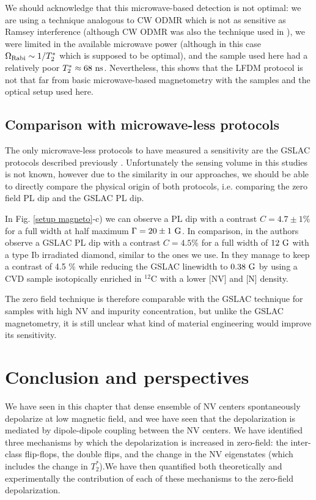 \documentclass[a4paper,11pt]{report}
\begin{document}
We should acknowledge that this microwave-based detection is not optimal: we are using a technique analogous to CW ODMR which is not as sensitive as Ramsey interference (although CW ODMR was also the technique used in \citep{barry2016optical}), we were limited in the available microwave power (although in this case $\Omega_{\rm Rabi} \sim 1/T_2^*$ which is supposed to be optimal), and the sample used here had a relatively poor $T_2^* \approx 68\ \rm ns$. Nevertheless, this shows that the LFDM protocol is not that far from basic microwave-based magnetometry with the samples and the optical setup used here.

\subsection{Comparison with microwave-less protocols}
The only microwave-less protocols to have measured a sensitivity are the GSLAC protocols described previously \citep{wickenbrock2016microwave, zheng2020microwave}. Unfortunately the sensing volume in this studies is not known, however due to the similarity in our approaches, we should be able to directly compare the physical origin of both protocols, i.e. comparing the zero field PL dip and the GSLAC PL dip.

In Fig. \ref{setup magneto}-c) we can observe a PL dip with a contrast $C=4.7\pm 1 \% $ for a full width at half maximum $\Gamma=20 \pm 1\ \rm G$. In comparison, in \citep{wickenbrock2016microwave} the authors observe a GSLAC PL dip with a contrast $C=4.5 \%$ for a full width of $12 \ \rm G$ with a type Ib irradiated diamond, similar to the ones we use. In \citep{zheng2020microwave} they manage to keep a contrast of 4.5 \% while reducing the GSLAC linewidth to $0.38\ \rm G$ by using a CVD sample isotopically enriched in $^{12}$C with a lower [NV] and [N] density.

The zero field technique is therefore comparable with the GSLAC technique for samples with high NV and impurity concentration, but unlike the GSLAC magnetometry, it is still unclear what kind of material engineering would improve its sensitivity.

\section{Conclusion and perspectives}
We have seen in this chapter that dense ensemble of NV centers spontaneously depolarize at low magnetic field, and wee have seen that the depolarization is mediated by dipole-dipole coupling between the NV centers. We have identified three mechanisms by which the depolarization is increased in zero-field: the inter-class flip-flops, the double flips, and the change in the NV eigenstates (which includes the change in $T_2^*$).We have then quantified both theoretically and experimentally the contribution of each of these mechanisms to the zero-field depolarization.
\end{document}
